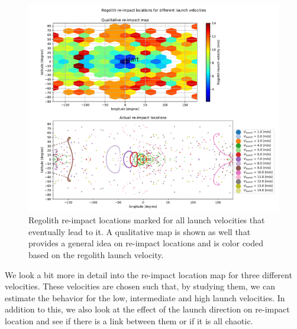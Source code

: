 \begin{figure}[htb]
\centering
\captionsetup{justification=centering}
\includegraphics[angle=90, width=\textwidth, height=\textheight, keepaspectratio=true]{Images/longest_edge_no_perturbations/crash_map_all_velocities_noGrid.pdf}
\caption{Regolith re-impact locations marked for all launch velocities that eventually lead to it. A qualitative map is shown as well that provides a general idea on re-impact locations and is color coded based on the regolith launch velocity.}
\label{fig:crashmap_all_noSP}
\end{figure}
\FloatBarrier
We look a bit more in detail into the re-impact location map for three different velocities. These velocities are chosen such that, by studying them, we can estimate the behavior for the low, intermediate and high launch velocities. In addition to this, we also look at the effect of the launch direction on re-impact location and see if there is a link between them or if it is all chaotic.
